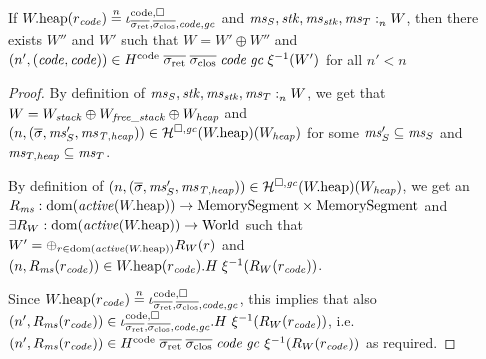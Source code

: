\documentclass[a4paper]{article}
\begin{document}
\begin{lemma}
  \label{lem:code-reg-and-mem-sat}
  If $\pwheap(r_\code) \nequal \codereg{\sigrets,\sigcloss,\code,\gc}$ and
  $\mathit{ms}_S,\mathit{stk},\mathit{ms}_{\mathit{stk}},\mathit{ms}_T :_{n}^{}W$, then there exists $W''$
  and $W'$ such that $W = W' \oplus W''$ and
  $\npair[n']{(\code,\code)} \in H^\mathrm{code} \; \sigrets \; \sigcloss \; \code \; \gc \; \xi^{-1}(W')$ for all $n' < n$
\end{lemma}
\begin{proof}
  By definition of $\mathit{ms}_S,\mathit{stk},\mathit{ms}_{\mathit{stk}},\mathit{ms}_T :_{n}^{}W$, we get that $W = W_{\mathit{stack}} \oplus W_{\mathit{free\_stack}} \oplus W_{\mathit{heap}}$ and
  $\left(n,(\overline{\sigma},\mathit{ms}_S',\mathit{ms}_{\mathit{T,heap}})\right) \in
  \mathcal{H}^{\square,\mathit{gc}}(W.\mathrm{heap})(W_{\mathit{heap}})$ for some $\mathit{ms}_S' \subseteq \mathit{ms}_S$ and $\mathit{ms}_{T,\mathit{heap}}\subseteq \mathit{ms}_T$.

  By definition of $\left(n,(\overline{\sigma},\mathit{ms}_S',\mathit{ms}_{\mathit{T,heap}})\right) \in
  \mathcal{H}^{\square,\mathit{gc}}(W.\mathrm{heap})(W_{\mathit{heap}})$, we get an
  $R_\ms : \dom(\activeReg{\pwheap}) \fun \MemSeg \times \MemSeg$ and $\exists R_W : \dom(\activeReg{\pwheap}) \fun \World$ such that $W' = \oplus_{r \in \dom(\activeReg{\pwheap})} R_W(r)$ and $\left(n,R_{\mathit{ms}}(r_{\mathit{code}})\right) \in  W.\mathrm{heap}(r_{\mathit{code}}).H \; \xi^{-1}(R_W(r_{\mathit{code}}))$.

  Since $\pwheap(r_\code) \nequal \codereg{\sigrets,\sigcloss,\code,\gc}$, this implies that also $\npair[n']{R_\ms(r_{\var{code}})} \in  \codereg{\sigrets,\sigcloss,\code,\gc}.H~ \xi^{-1}(R_W(r_{\var{code}}))$, i.e. $\npair[n']{R_\ms(r_{\var{code}})} \in  H^\mathrm{code} \; \sigrets \; \sigcloss \; \code \; \gc~ \xi^{-1}(R_W(r_{\var{code}}))$ as required.
\end{proof}
\end{document}
